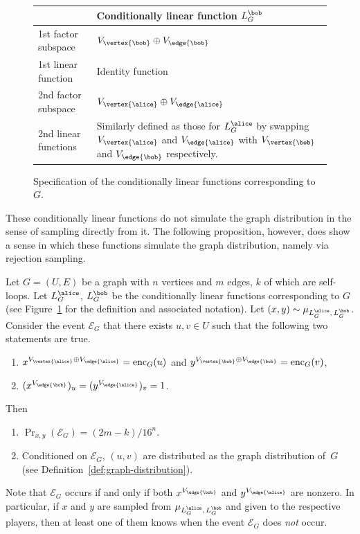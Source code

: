 \begin{figure}[!htb]
\begin{gamespec}
    \begin{tabularx}{\textwidth}{p{3.8cm}X}
      \multicolumn{2}{c}{\textbf{Conditionally linear function $L^\bob_G$}}\\
      \midrule
      1st factor subspace & $V_{\vertex{\bob}} \oplus V_{\edge{\bob}}$\\
      1st linear function & Identity function\\
      \midrule
      2nd factor subspace & $V_{\vertex{\alice}} \oplus V_{\edge{\alice}}$\\
      2nd linear functions & Similarly defined as those for $L^\alice_G$ by swapping
      $V_{\vertex{\alice}}$ and $V_{\edge{\alice}}$ with $V_{\vertex{\bob}}$ and
      $V_{\edge{\bob}}$ respectively.\\
      \midrule
    \end{tabularx}
  \end{gamespec}
  \caption{Specification of the conditionally linear functions corresponding
    to~$G$.}
  \label{fig:graph-distribution}
\end{figure}

These conditionally linear functions do not simulate the graph distribution
in the sense of sampling directly from it.
The following proposition, however, does show a sense in which these functions
simulate the graph distribution, namely via rejection sampling.

\begin{proposition}
  \label{prop:simulating-graph}
  Let $G = (U, E)$ be a graph with $n$ vertices and $m$ edges, $k$ of which
  are self-loops.
  Let $L^\alice_G$, $L^\bob_G$ be the conditionally linear functions
  corresponding to $G$ (see Figure~\ref{fig:graph-distribution} for the
  definition and associated notation).
  Let $(x, y) \sim \mu_{L^\alice_G,\, L^\bob_G}$.
  Consider the event $\mathcal{E}_G$ that there exists $u, v \in U$ such that
  the following two statements are true.
  \begin{enumerate}[label=(\roman*)]
  \item $x^{V_{\vertex{\alice}} \oplus V_{\edge{\alice}}} = \mathrm{enc}_G(u)$
   	and $y^{V_{\vertex{\bob}} \oplus V_{\edge{\bob}}} = \mathrm{enc}_G(v)$,
  \item  $(x^{V_{\edge{\bob}}})_u = (y^{V_{\edge{\alice}}})_v = 1$.
  \end{enumerate}
  Then
  \begin{enumerate}
  \item \label{item:graph-prob} $\Pr_{x, y} (\mathcal{E}_G) = (2m-k)/16^n$.
  \item \label{item:edge-dist} Conditioned on $\mathcal{E}_G$, $(u, v)$ are
    distributed as the graph distribution of~$G$ (see
    Definition~\ref{def:graph-distribution}).
  \end{enumerate}
  Note that $\mathcal{E}_G$ occurs if and only if both $x^{V_\edge{\bob}}$ and
  $y^{V_\edge{\alice}}$ are nonzero.
  In particular, if $x$ and $y$ are sampled from $\mu_{L^\alice_G,\, L^\bob_G}$
  and given to the respective players, then at least one of them knows when the
  event $\mathcal{E}_G$ does \emph{not} occur.
\end{proposition}

